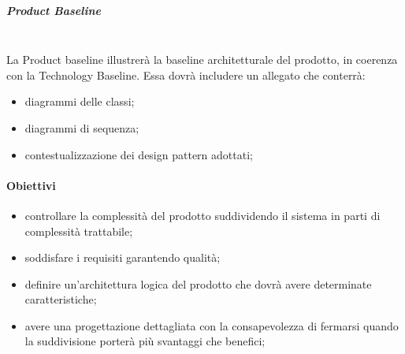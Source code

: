 	\subparagraph{Product Baseline}\mbox{}\\
	La Product baseline illustrerà la baseline architetturale del prodotto, in coerenza con la Technology Baseline.
	Essa dovrà includere un allegato che conterrà:
	\begin{itemize}
		\item	diagrammi delle classi;
		\item	diagrammi di sequenza;
		\item	contestualizzazione dei design pattern adottati;	
	\end{itemize}

\paragraph{Obiettivi}
\begin{itemize}
	\item controllare la complessità del prodotto suddividendo il sistema in parti di complessità trattabile;
	\item soddisfare i requisiti garantendo qualità;
	\item definire un’architettura logica del prodotto che dovrà avere determinate caratteristiche;
	\item avere una progettazione dettagliata con la consapevolezza di fermarsi quando la suddivisione porterà più svantaggi che benefici;
\end{itemize}

